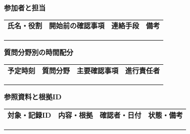\documentclass[11pt,a4paper]{article}
\begin{document}
\par{}\noindent\textbf{参加者と担当}\par\vspace{1mm}
{\fontsize{8.5}{13}\selectfont
\begin{tabularx}{\linewidth}{@{}XXXX@{}}
\textbf{氏名・役割} & \textbf{開始前の確認事項} & \textbf{連絡手段} & \textbf{備考}\\[2mm]
\strut & \strut & \strut & \strut\\[5mm]
\strut & \strut & \strut & \strut\\[5mm]
\strut & \strut & \strut & \strut\\[5mm]
\end{tabularx}
}\vspace{2mm}\par
\par{}\noindent\textbf{質問分野別の時間配分}\par\vspace{1mm}
{\fontsize{8.5}{13}\selectfont
\begin{tabularx}{\linewidth}{@{}XXXX@{}}
\textbf{予定時刻} & \textbf{質問分野} & \textbf{主要確認事項} & \textbf{進行責任者}\\[2mm]
\strut & \strut & \strut & \strut\\[5mm]
\strut & \strut & \strut & \strut\\[5mm]
\strut & \strut & \strut & \strut\\[5mm]
\end{tabularx}
}\vspace{2mm}\par
{}
\par{}\noindent\textbf{参照資料と根拠ID}\par\vspace{1mm}
{\fontsize{8.5}{13}\selectfont
\begin{tabularx}{\linewidth}{@{}XXXX@{}}
\textbf{対象・記録ID} & \textbf{内容・根拠} & \textbf{確認者・日付} & \textbf{状態・備考}\\[2mm]
\strut & \strut & \strut & \strut\\[5mm]
\strut & \strut & \strut & \strut\\[5mm]
\strut & \strut & \strut & \strut\\[5mm]
\end{tabularx}
}\vspace{2mm}\par
\end{document}
